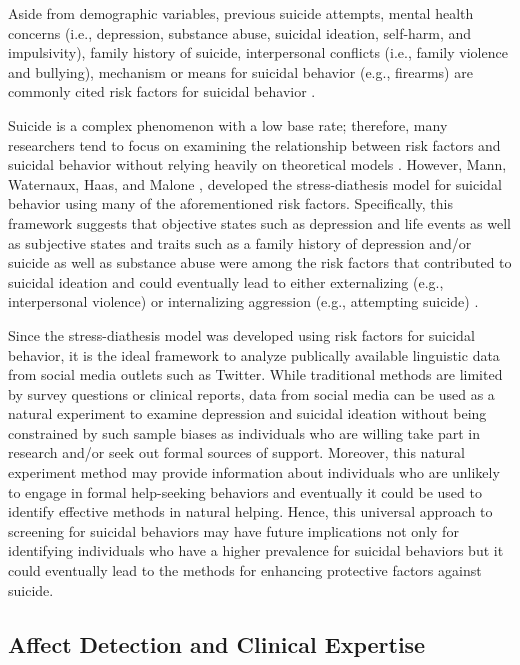 \documentclass[11pt]{article}
\begin{document}
	Aside from demographic variables, previous suicide attempts, mental health concerns (i.e., depression, substance abuse, suicidal ideation, self-harm, and impulsivity), family history of suicide, interpersonal conflicts (i.e., family violence and bullying), mechanism or means for suicidal behavior (e.g., firearms)  are commonly cited risk factors for suicidal behavior \cite{nock2008suicide,crosby2011self,gaynes2004screening,harriss2005suicidal,shaffer2004columbia,shaffer2004columbia,brown2000risk}. 

Suicide is a complex phenomenon with a low base rate; therefore, many researchers tend to focus on examining the relationship between risk factors and suicidal behavior without relying heavily on theoretical models \cite{nock2008suicide} .  However, Mann, Waternaux, Haas, and Malone \cite{mann1999toward}, developed the stress-diathesis model for suicidal behavior using many of the aforementioned risk factors. Specifically, this framework suggests that objective states such as depression and life events as well as subjective states and traits such as a family history of depression and/or suicide as well as substance abuse were among the risk factors that contributed to suicidal ideation and could eventually lead to either externalizing (e.g., interpersonal violence) or internalizing aggression (e.g., attempting suicide) \cite{mann1999toward}.

	Since the stress-diathesis model was developed using risk factors for suicidal behavior, it is the ideal framework to analyze publically available linguistic data from social media outlets such as Twitter. While traditional methods are limited by survey questions or clinical reports, data from social media can be used as a natural experiment to examine depression and suicidal ideation without being constrained by such sample biases as individuals who are willing take part in research and/or seek out formal sources of support. Moreover, this natural experiment method may provide information about individuals who are unlikely to engage in formal help-seeking behaviors and eventually it could be used to identify effective methods in natural helping. Hence, this universal approach to screening for suicidal behaviors may have future implications not only for identifying individuals who have a higher prevalence for suicidal behaviors but it could eventually lead to the methods for enhancing protective factors against suicide.  


\subsection{Affect Detection and Clinical Expertise}
\end{document}
